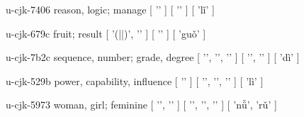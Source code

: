 \begin{multicols}{2}
\cjkgGlue{} u-cjk-7406  reason, logic; manage  [ '\cjkgGlue{}' ]  [ '\cjkgGlue{}' ]  [ 'l{\mktsRsgFb{}ǐ}' ] 

\cjkgGlue{} u-cjk-679c  fruit; result  [ '\cjkgGlue{}(\cjkgGlue{}|\cjkgGlue{}|\cjkgGlue{})', '\cjkgGlue{}' ]  [ '\cjkgGlue{}' ]  [ 'gu{\mktsRsgFb{}ǒ}' ] 

\cjkgGlue{} u-cjk-7b2c  sequence, number; grade, degree  [ '\cjkgGlue{}', '\cjkgGlue{}', '\cjkgGlue{}' ]  [ '\cjkgGlue{}', '\cjkgGlue{}' ]  [ 'dì' ] 

\cjkgGlue{} u-cjk-529b  power, capability, influence  [ '\cjkgGlue{}' ]  [ '\cjkgGlue{}', '\cjkgGlue{}', '\cjkgGlue{}' ]  [ 'lì' ] 

\cjkgGlue{} u-cjk-5973  woman, girl; feminine  [ '\cjkgGlue{}', '\cjkgGlue{}' ]  [ '\cjkgGlue{}', '\cjkgGlue{}', '\cjkgGlue{}' ]  [ 'n{\mktsRsgFb{}ǚ}', 'r{\mktsRsgFb{}ǔ}' ] 


\end{multicols}
